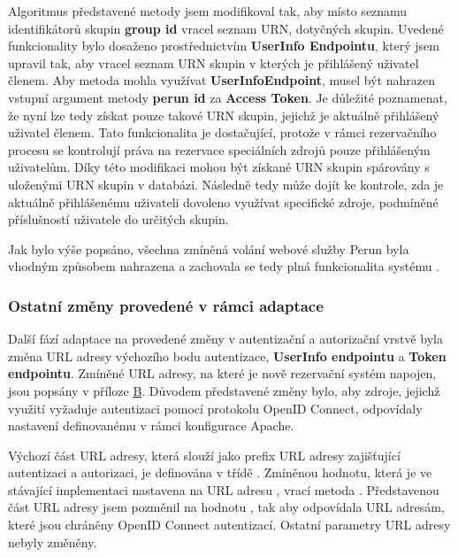 \documentclass[
  printed, %
  twoside, %
  table,   %
  nolof,     %
  nolot,     %
]{fithesis3}
\begin{document}
Algoritmus představené metody  jsem modifikoval tak, aby místo seznamu identifikátorů skupin \textbf{group id} vracel seznam URN, dotyčných skupin. Uvedené funkcionality bylo dosaženo prostřednictvím \textbf{UserInfo Endpointu}, který jsem upravil tak, aby vracel seznam URN skupin v kterých je přihlášený uživatel členem. Aby metoda  mohla využívat \textbf{UserInfo\break Endpoint}, musel být nahrazen vstupní argument metody \textbf{perun id} za \textbf{Access Token}. Je důležité poznamenat, že nyní lze tedy získat pouze takové URN skupin, jejichž je aktuálně přihlášený uživatel členem. Tato funkcionalita je dostačující, protože v rámci rezervačního procesu se kontrolují práva na rezervace speciálních zdrojů pouze přihlášeným uživatelům. Díky této modifikaci mohou být získané URN skupin spárovány s uloženými URN skupin v databázi. Následně tedy může dojít ke kontrole, zda je aktuálně přihlášenému uživateli dovoleno využívat specifické zdroje, podmíněné příslušností uživatele do určitých skupin.

\par

Jak bylo výše popsáno, všechna zmíněná volání webové služby Perun byla vhodným způsobem nahrazena a zachovala se tedy plná funkcionalita systému .

\subsubsection{Ostatní změny provedené v rámci adaptace}
Další fází adaptace na provedené změny v autentizační a autorizační vrstvě byla změna URL adresy výchozího bodu autentizace, \textbf{UserInfo endpointu} a \textbf{Token endpointu}. Zmíněné URL adresy, na které je nově rezervační systém  napojen, jsou popsány v příloze \hyperref[oidcEndpoints]{B}. Důvodem představené změny bylo, aby zdroje, jejichž využití vyžaduje autentizaci pomocí protokolu OpenID Connect, odpovídaly nastavení definovanému v rámci konfigurace Apache. \par


Výchozí část URL adresy, která slouží jako prefix URL adresy zajišťující autentizaci a autorizaci, je definována v třídě . Zmíněnou hodnotu, která je ve stávající implementaci nastavena na URL adresu , vrací metoda . Představenou část URL adresy jsem pozměnil na hodnotu , tak aby odpovídala URL adresám, které jsou chráněny OpenID Connect autentizací. Ostatní parametry URL adresy nebyly změněny. 
\par
\end{document}
